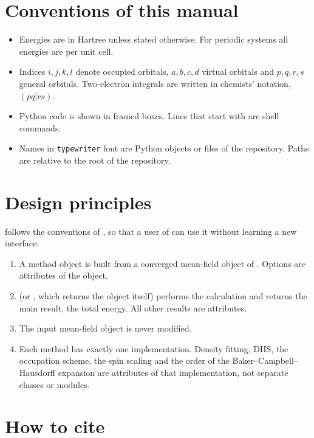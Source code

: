 \section{Conventions of this manual}

\begin{itemize}
  \item Energies are in Hartree unless stated otherwise. For periodic
        systems all energies are per unit cell.
  \item Indices $i,j,k,l$ denote occupied orbitals, $a,b,c,d$ virtual
        orbitals and $p,q,r,s$ general orbitals. Two-electron integrals are
        written in chemists' notation, $(pq|rs)$.
  \item Python code is shown in framed boxes. Lines that start with
        \code{$} are shell commands.
  \item Names in \texttt{typewriter} font are Python objects or files of the
        repository. Paths are relative to the root of the repository.
\end{itemize}

\section{Design principles}

\pycmf{} follows the conventions of \pyscf{}, so that a user of \pyscf{} can
use it without learning a new interface:

\begin{enumerate}
  \item A method object is built from a converged mean-field object of
        \pyscf{}. Options are attributes of the object.
  \item {} (or , which returns the object itself)
        performs the calculation and returns the main result, the total
        energy. All other results are attributes.
  \item The input mean-field object is never modified.
  \item Each method has exactly one implementation. Density fitting, DIIS,
        the occupation scheme, the spin scaling and the order of the
        Baker--Campbell--Hausdorff expansion are attributes of that
        implementation, not separate classes or modules.
\end{enumerate}

\section{How to cite}

